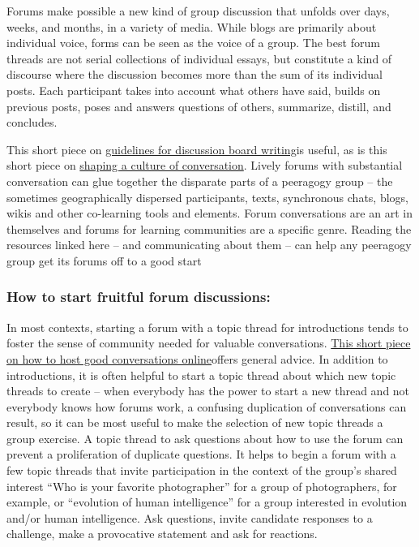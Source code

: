 Forums make possible a new kind of group discussion that unfolds over
days, weeks, and months, in a variety of media. While blogs are
primarily about individual voice, forms can be seen as the voice of a
group. The best forum threads are not serial collections of individual
essays, but constitute a kind of discourse where the discussion becomes
more than the sum of its individual posts. Each participant takes into
account what others have said, builds on previous posts, poses and
answers questions of others, summarize, distill, and concludes.

This short piece on
\href{http://www.lehigh.edu/~indiscus/doc_guidelines.html}{guidelines
for discussion board writing}is useful, as is this short piece on
\href{http://academiccommons.org/commons/essay/shaping-culture-conversation}{shaping
a culture of conversation}. Lively forums with substantial conversation
can glue together the disparate parts of a peeragogy group -- the
sometimes geographically dispersed participants, texts, synchronous
chats, blogs, wikis and other co-learning tools and elements. Forum
conversations are an art in themselves and forums for learning
communities are a specific genre. Reading the resources linked here --
and communicating about them -- can help any peeragogy group get its
forums off to a good start

\subsubsection{How to start fruitful forum discussions:}

In most contexts, starting a forum with a topic thread for introductions
tends to foster the sense of community needed for valuable
conversations.
\href{http://www.rheingold.com/texts/artonlinehost.html}{This short
piece on how to host good conversations online}offers general advice. In
addition to introductions, it is often helpful to start a topic thread
about which new topic threads to create -- when everybody has the power
to start a new thread and not everybody knows how forums work, a
confusing duplication of conversations can result, so it can be most
useful to make the selection of new topic threads a group exercise. A
topic thread to ask questions about how to use the forum can prevent a
proliferation of duplicate questions. It helps to begin a forum with a
few topic threads that invite participation in the context of the
group's shared interest ``Who is your favorite photographer'' for a
group of photographers, for example, or ``evolution of human
intelligence'' for a group interested in evolution and/or human
intelligence. Ask questions, invite candidate responses to a challenge,
make a provocative statement and ask for reactions.

